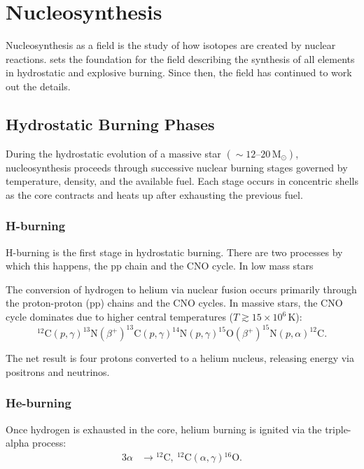 \section{Nucleosynthesis}

Nucleosynthesis as a field is the study of how isotopes are created by nuclear reactions.
\cite{burbidgeSynthesisElementsStars1957} sets the foundation for the field describing the synthesis of all elements in hydrostatic and explosive burning.
Since then, the field has continued to work out the details.

\subsection{Hydrostatic Burning Phases}

During the hydrostatic evolution of a massive star $(\sim 12\text{–}20\,\mathrm{M}_\odot)$, nucleosynthesis proceeds through successive nuclear burning stages governed by temperature, density, and the available fuel.
Each stage occurs in concentric shells as the core contracts and heats up after exhausting the previous fuel.

\subsubsection{H-burning}

H-burning is the first stage in hydrostatic burning. 
There are two processes by which this happens, the pp chain and the CNO cycle.
In low mass stars 

The conversion of hydrogen to helium via nuclear fusion occurs primarily through the proton-proton (pp) chains and the CNO cycles. In massive stars, the CNO cycle dominates due to higher central temperatures (\( T \gtrsim 15 \times 10^6\,\mathrm{K} \)):
\begin{equation}
^{12}\mathrm{C}(p,\gamma)^{13}\mathrm{N}(\beta^+)^{13}\mathrm{C}(p,\gamma)^{14}\mathrm{N}(p,\gamma)^{15}\mathrm{O}(\beta^+)^{15}\mathrm{N}(p,\alpha)^{12}\mathrm{C}.
\end{equation}

The net result is four protons converted to a helium nucleus, releasing energy via positrons and neutrinos.

\subsubsection{He-burning}

Once hydrogen is exhausted in the core, helium burning is ignited via the triple-alpha process:
\begin{align}
3\alpha &\rightarrow {}^{12}\mathrm{C}, \
{}^{12}\mathrm{C}(\alpha,\gamma){}^{16}\mathrm{O}.
\end{align}

